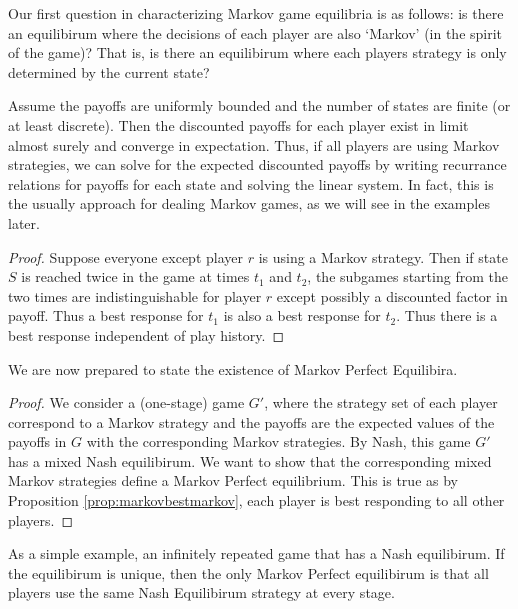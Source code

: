 Our first question in characterizing Markov game equilibria is as follows: is there an equilibirum where the decisions of each player are also `Markov' (in the spirit of the game)? That is, is there an equilibirum where each players strategy is only determined by the current state?
\begin{remark}
    Assume the payoffs are uniformly bounded and the number of states are finite (or at least discrete). Then the discounted payoffs for each player exist in limit almost surely and converge in expectation. Thus, if all players are using Markov strategies, we can solve for the expected discounted payoffs by writing recurrance relations for payoffs for each state and solving the linear system. In fact, this is the usually approach for dealing Markov games, as we will see in the examples later.
\end{remark}
\begin{proof}
    Suppose everyone except player $r$ is using a Markov strategy. Then if state $S$ is reached twice in the game at times $t_1$ and $t_2$, the subgames starting from the two times are indistinguishable for player $r$ except possibly a discounted factor in payoff. Thus a best response for $t_1$ is also a best response for $t_2$. Thus there is a best response independent of play history.
\end{proof}

We are now prepared to state the existence of Markov Perfect Equilibira.
\begin{proof}
    We consider a (one-stage) game $G'$, where the strategy set of each player correspond to a Markov strategy and the payoffs are the expected values of the payoffs in $G$ with the corresponding Markov strategies. By Nash, this game $G'$ has a mixed Nash equilibirum. We want to show that the corresponding mixed Markov strategies define a Markov Perfect equilibrium. This is true as by Proposition \ref{prop:markovbestmarkov}, each player is best responding to all other players.
\end{proof}
As a simple example, an infinitely repeated game that has a Nash equilibirum. If the equilibirum is unique, then the only Markov Perfect equilibirum is that all players use the same Nash Equilibirum strategy at every stage.
